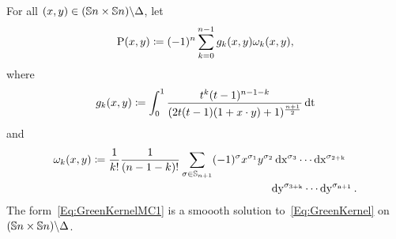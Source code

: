 \documentclass[\MainFolder/Text.tex]{subfiles}
\begin{document}
\begin{Proposition} \label{Prop:GKerSph}
For all $(x,y)\in (\mathbb{S}{n}\times \mathbb{S}{n}) \backslash \Delta$, let
\begin{equation} \label{Eq:GreenKernelMC1}
\mathrm{P} (x,y) \coloneqq (-1)^{n} \sum_{k=0}^{n-1} g_k(x,y)\omega_k(x,y),
\end{equation}
where
\begin{equation}\label{Eq:FunctionsGk1}
 g_k(x,y) \coloneqq \int_{0}^1 \frac{t^k(t-1)^{n-1-k}}{(2t(t-1)(1+x\cdot y) + 1)^{\frac{n+1}{2}}} \operatorname{dt}
\end{equation}
and 
\begin{equation} \label{Eq:FormOmega1}
\omega_k(x,y) \coloneqq \begin{multlined}[t]\frac{1}{k!} \frac{1}{(n-1-k)!} \sum_{\sigma \in \Perm_{n+1}} (-1)^\sigma x^{\sigma_1} y^{\sigma_2} \Diff{x^{\sigma_3}} \dotsm \Diff{x^{\sigma_{2+k}}} \\ \Diff{y^{\sigma_{3+k}}} \dotsm \Diff{y^{\sigma_{n+1}}}.\end{multlined}
\end{equation}
The form~\eqref{Eq:GreenKernelMC1} is a smoooth solution to~\eqref{Eq:GreenKernel} on $(\mathbb{S}{n}\times \mathbb{S}{n}) \backslash \Delta$.
\end{Proposition}
%
\end{document}
